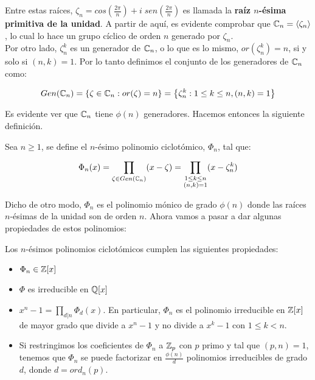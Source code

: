 Entre estas raíces, $\zeta_n = cos\left(\frac{2\pi}{n}\right) + i\;sen\left(\frac{2\pi}{n}\right)$ es llamada la \textbf{raíz $n$-ésima primitiva de la unidad}. A partir de aquí, es evidente comprobar que $\mathbb{C}_n = \left\langle \zeta_n \right\rangle$, lo cual lo hace un grupo cíclico de orden $n$ generado por $\zeta_n$.\\

Por otro lado, $\zeta_n^k$ es un generador de $\mathbb{C}_n$, o lo que es lo mismo, $or(\zeta_n^k) = n$, si y solo si $(n, k) = 1$. Por lo tanto definimos el conjunto de los generadores de $\mathbb{C}_n$ como:

\[ Gen(\mathbb{C}_n) = \left\lbrace \zeta \in \mathbb{C}_n : or(\zeta) = n \right\rbrace = \left\lbrace \zeta_n^k : 1 \leq k \leq n, (n, k) = 1 \right\rbrace \]

Es evidente ver que $\mathbb{C}_n$ tiene $\phi(n)$ generadores. Hacemos entonces la siguiente definición.

\begin{definicion}
	Sea $n \geq 1$, se define el $n$-ésimo polinomio ciclotómico, $\Phi_n$, tal que:
	
	\begin{equation}\label{formula_polinomio_ciclotomico}
	\Phi_n(x) = \prod_{\zeta \in Gen(\mathbb{C}_n)}(x - \zeta) = \prod_{\substack{1 \leq k \leq n \\ (n, k) = 1}}(x - \zeta_n^k)
	\end{equation}
\end{definicion}

Dicho de otro modo, $\Phi_n$ es el polinomio mónico de grado $\phi(n)$ donde las raíces $n$-ésimas de la unidad son de orden $n$. Ahora vamos a pasar a dar algunas propiedades de estos polinomios:

\begin{proposicion}
	Los $n$-ésimos polinomios ciclotómicos cumplen las siguientes propiedades:
	
	\begin{itemize}
		\item $\Phi_n \in \mathbb{Z}[x]$
		
		\item $\Phi$ es irreducible en $\mathbb{Q}[x]$
		
		\item $x^n - 1 = \prod_{d|n}\Phi_d(x)$. En particular, $\Phi_n$ es el polinomio irreducible en $\mathbb{Z}[x]$ de mayor grado que divide a $x^n - 1$ y no divide a $x^k - 1$ con $1 \leq k < n$.
		
		\item Si restringimos los coeficientes de $\Phi_n$ a $\mathbb{Z}_p$ con $p$ primo y tal que $(p, n) = 1$, tenemos que $\Phi_n$ se puede factorizar en $\frac{\phi(n)}{d}$ polinomios irreducibles de grado $d$, donde $d = ord_n(p)$.
	\end{itemize}
\end{proposicion}

